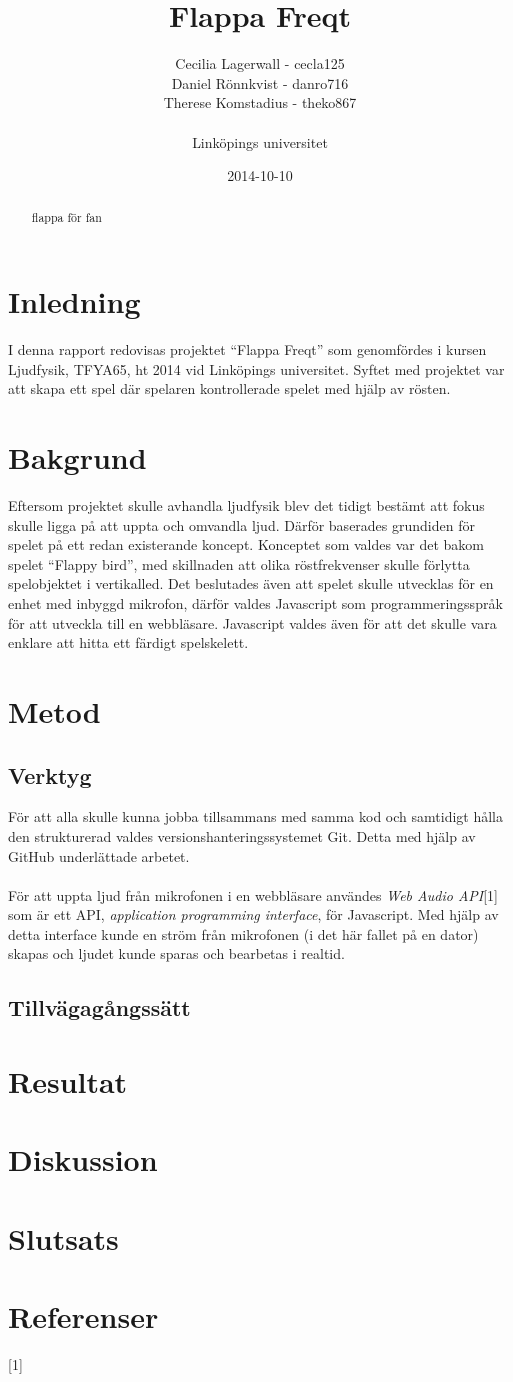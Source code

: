 \documentclass[12pt, titlepage, twoside, a4paper]{article}
\begin{document}
\title{Flappa Freqt}
\author{Cecilia Lagerwall - cecla125 \\ Daniel Rönnkvist - danro716 \\ 
Therese Komstadius - theko867 \\ \\ Linköpings universitet}
\date{2014-10-10}
\maketitle
\begin{abstract}
flappa för fan
\end{abstract}
\section{Inledning}
I denna rapport redovisas projektet “Flappa Freqt” som genomfördes i kursen Ljudfysik, TFYA65, ht 2014 vid Linköpings universitet. Syftet med projektet var att skapa ett spel där spelaren kontrollerade spelet med hjälp av rösten.
\section{Bakgrund}
Eftersom projektet skulle avhandla ljudfysik blev det tidigt bestämt att fokus skulle ligga på att uppta och omvandla ljud. Därför baserades grundiden för spelet på ett redan existerande koncept. Konceptet som valdes var det bakom spelet “Flappy bird”, med skillnaden att olika röstfrekvenser skulle förlytta spelobjektet i vertikalled. Det beslutades även att spelet skulle utvecklas för en enhet med inbyggd mikrofon, därför valdes Javascript som programmeringsspråk för att utveckla till en webbläsare. Javascript valdes även för att det skulle vara enklare att hitta ett färdigt spelskelett.
\section{Metod}
\subsection{Verktyg}
För att alla skulle kunna jobba tillsammans med samma kod och samtidigt hålla den strukturerad valdes versionshanteringssystemet Git. Detta med hjälp av GitHub underlättade arbetet.
\\ \\
För att uppta ljud från mikrofonen i en webbläsare användes \textit{Web Audio API}[1] som är ett API, \textit{application programming interface}, för Javascript. Med hjälp av detta interface kunde en ström från mikrofonen (i det här fallet på en dator) skapas och ljudet kunde sparas och bearbetas i realtid.
\subsection{Tillvägagångssätt}
\section{Resultat}
\section{Diskussion}
\section{Slutsats}
\section{Referenser}
[1]
\end{document}
